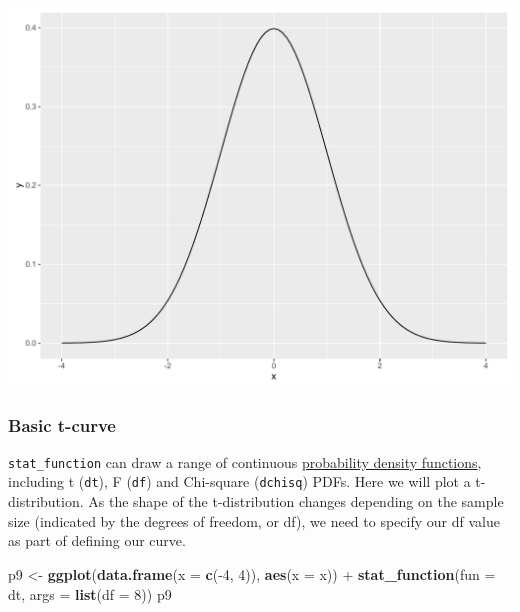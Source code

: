 \documentclass[]{article}
\newenvironment{Shaded}{\begin{snugshade}}{\end{snugshade}}
\newcommand{\KeywordTok}[1]{\textcolor[rgb]{0.13,0.29,0.53}{\textbf{{#1}}}}
\newcommand{\DataTypeTok}[1]{\textcolor[rgb]{0.13,0.29,0.53}{{#1}}}
\newcommand{\DecValTok}[1]{\textcolor[rgb]{0.00,0.00,0.81}{{#1}}}
\newcommand{\StringTok}[1]{\textcolor[rgb]{0.31,0.60,0.02}{{#1}}}
\newcommand{\NormalTok}[1]{{#1}}
\begin{document}
\begin{center}\includegraphics{0_all_posts_pdf/function_1-1} \end{center}

\subsubsection{Basic t-curve}\label{basic-t-curve}

\texttt{stat\_function} can draw a range of continuous
\href{https://en.wikipedia.org/wiki/Probability_density_function}{probability
density functions}, including t (\texttt{dt}), F (\texttt{df}) and
Chi-square (\texttt{dchisq}) PDFs. Here we will plot a t-distribution.
As the shape of the t-distribution changes depending on the sample size
(indicated by the degrees of freedom, or df), we need to specify our df
value as part of defining our curve.

\begin{Shaded}
\begin{Highlighting}[]
\NormalTok{p9 <-}\StringTok{ }\KeywordTok{ggplot}\NormalTok{(}\KeywordTok{data.frame}\NormalTok{(}\DataTypeTok{x =} \KeywordTok{c}\NormalTok{(-}\DecValTok{4}\NormalTok{, }\DecValTok{4}\NormalTok{)), }\KeywordTok{aes}\NormalTok{(}\DataTypeTok{x =} \NormalTok{x)) +}
\StringTok{      }\KeywordTok{stat_function}\NormalTok{(}\DataTypeTok{fun =} \NormalTok{dt, }\DataTypeTok{args =} \KeywordTok{list}\NormalTok{(}\DataTypeTok{df =} \DecValTok{8}\NormalTok{))}
\NormalTok{p9}
\end{Highlighting}
\end{Shaded}
\end{document}

